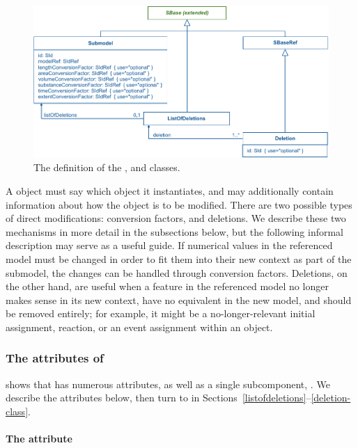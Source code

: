 \begin{figure}[hbt]
  \includegraphics{figs/submodel-uml}
  \caption{The definition of the \Submodel, \Deletion and
    \ListOfDeletions classes.}
  \label{submodel-uml}
\end{figure}

A \Submodel object must say which \Model object it instantiates, and may
additionally contain information about how the \Model object is to be
modified.  There are two possible types of direct modifications:
conversion factors, and deletions.  We describe these two mechanisms in
more detail in the subsections below, but the following informal
description may serve as a useful guide.  If numerical values in the
referenced model must be changed in order to fit them into their new
context as part of the submodel, the changes can be handled through
conversion factors.  Deletions, on the other hand, are useful when a
feature in the referenced model no longer makes sense in its new context, have no equivalent in the new model,
and should be removed entirely; for example, it might be a
no-longer-relevant initial assignment, reaction, or an event assignment
within an \Event object.


\subsubsection{The attributes of }

 shows that \Submodel has numerous attributes, as well
as a single subcomponent, .  We describe the
attributes below, then turn to  in
Sections~\ref{listofdeletions}--\ref{deletion-class}.


\paragraph{The \hspace*{1pt} attribute}

